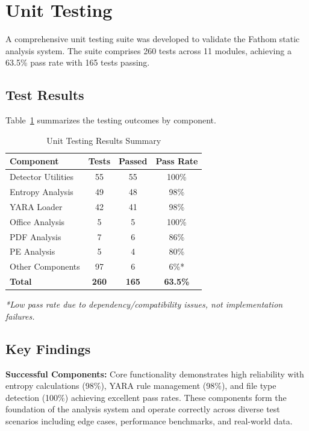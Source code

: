 
\section{Unit Testing}

A comprehensive unit testing suite was developed to validate the Fathom static analysis system. The suite comprises 260 tests across 11 modules, achieving a 63.5\% pass rate with 165 tests passing.

\subsection{Test Results}

Table~\ref{tab:test_results} summarizes the testing outcomes by component.

\begin{table}[h]
\centering
\caption{Unit Testing Results Summary}
\label{tab:test_results}
\begin{tabular}{|l|c|c|c|}
\hline
\textbf{Component} & \textbf{Tests} & \textbf{Passed} & \textbf{Pass Rate} \\
\hline
Detector Utilities & 55 & 55 & 100\% \\
Entropy Analysis & 49 & 48 & 98\% \\
YARA Loader & 42 & 41 & 98\% \\
Office Analysis & 5 & 5 & 100\% \\
PDF Analysis & 7 & 6 & 86\% \\
PE Analysis & 5 & 4 & 80\% \\
Other Components & 97 & 6 & 6\%* \\
\hline
\textbf{Total} & \textbf{260} & \textbf{165} & \textbf{63.5\%} \\
\hline
\end{tabular}
\end{table}

\noindent\textit{*Low pass rate due to dependency/compatibility issues, not implementation failures.}

\subsection{Key Findings}

\textbf{Successful Components:} Core functionality demonstrates high reliability with entropy calculations (98\%), YARA rule management (98\%), and file type detection (100\%) achieving excellent pass rates. These components form the foundation of the analysis system and operate correctly across diverse test scenarios including edge cases, performance benchmarks, and real-world data.

